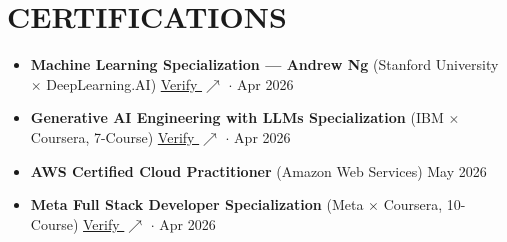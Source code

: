 \documentclass[letterpaper,9pt]{extarticle}
\begin{document}
\section{CERTIFICATIONS}
\begin{itemize}[leftmargin=0.15in, label=\textbullet, noitemsep, topsep=0pt, parsep=-1.0pt, partopsep=0pt]
  \item \textbf{Machine Learning Specialization --- Andrew Ng} (Stanford University $\times$ DeepLearning.AI) \hfill \href{https://coursera.org/verify/specialization/C4LDGPA0PTR6}{\color{dark-grey}\small Verify $\nearrow$} {\color{dark-grey}\small $\cdot$ Apr 2026}
  \item \textbf{Generative AI Engineering with LLMs Specialization} (IBM $\times$ Coursera, 7-Course) \hfill \href{https://coursera.org/verify/specialization/3RRSJUSH4IJR}{\color{dark-grey}\small Verify $\nearrow$} {\color{dark-grey}\small $\cdot$ Apr 2026}
  \item \textbf{AWS Certified Cloud Practitioner} (Amazon Web Services) \hfill {\color{dark-grey}\small May 2026}
  \item \textbf{Meta Full Stack Developer Specialization} (Meta $\times$ Coursera, 10-Course) \hfill \href{https://coursera.org/verify/specialization/YHSU2D2HO31R}{\color{dark-grey}\small Verify $\nearrow$} {\color{dark-grey}\small $\cdot$ Apr 2026}
\end{itemize}
\end{document}
